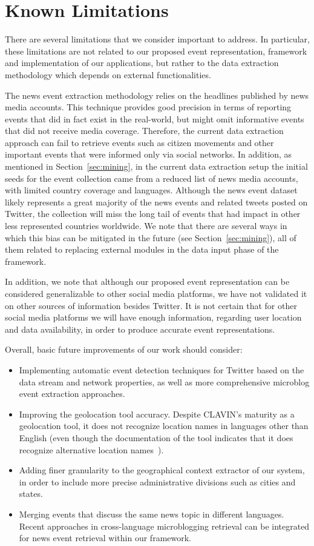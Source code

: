 \section{Known Limitations}\label{sec:limitations}
There are several limitations that we
consider important to address. In particular, these limitations are
not related to our proposed event representation, framework and implementation of our
applications, but rather to the data extraction methodology which
depends on external functionalities.

The news event extraction methodology relies on the headlines
published by news media accounts. This technique provides good
precision in terms of reporting events that did in fact exist in the
real-world, but might omit informative events that did not receive
media coverage. Therefore, the current data extraction approach can
fail to retrieve events such as citizen movements and other important
events that were informed only via social networks.  In addition, as
mentioned in Section~\ref{sec:mining}, in the current data extraction
setup the initial seeds for the event collection came from a reduced list
of news media accounts, with limited country coverage and languages.
Although the news event dataset likely represents a great majority of
the news events and related tweets posted on Twitter, the collection
will miss the long tail of events that had impact in other less
represented countries worldwide. We
note that there are several ways in which this bias can be mitigated
in the future (see Section~\ref{sec:mining}), all of them related to
replacing external modules in the data input phase of the framework.

In addition, we note that although our proposed event representation can be considered
generalizable to other social media platforms, we have not validated it on
other sources of information besides Twitter. It is not certain that for
other social media platforms we will have enough information, regarding
user location and data availability, in order to produce accurate event
representations.

Overall, basic future improvements of our work should consider:
\begin{itemize}
\item Implementing automatic event detection techniques for Twitter
based on the data stream and network properties, as well as
more comprehensive microblog event extraction approaches.
\item Improving the geolocation tool accuracy. Despite CLAVIN's maturity as a
geolocation tool, it does not recognize
location names in languages other than English (even though the
documentation of the tool indicates that it does recognize alternative
location
names~\cite{clavin}).
\item Adding finer granularity to the geographical context extractor of our
system, in order to include more precise
administrative divisions such as cities and states.
\item Merging events that discuss the same news topic in different languages. Recent approaches in cross-language
microblogging retrieval \cite{Godavarthy2016} can be integrated for
news event retrieval within our framework.
\end{itemize}

